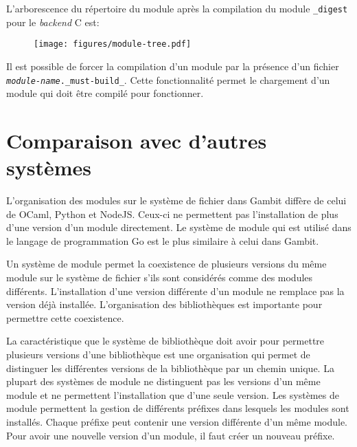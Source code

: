 L'arborescence du répertoire du module après la compilation du module
\texttt{\_digest} pour le \textit{backend} C est:
%
\begin{figure}[ht]
  \centering
  \texttt{[image: figures/module-tree.pdf]}
\end{figure}

Il est possible de forcer la compilation d'un module par la présence d'un fichier
\texttt{\textit{module-name}.\_must-build\_}. Cette fonctionnalité permet le chargement d'un
module qui doit être compilé pour fonctionner.


\section{Comparaison avec d'autres systèmes}

L'organisation des modules sur le système de fichier dans Gambit
diffère de celui de OCaml, Python et NodeJS. Ceux-ci ne permettent pas
l'installation de plus d'une version d'un module directement. Le système
de module qui est utilisé dans le langage de programmation Go est le plus
similaire à celui dans Gambit.

Un système de module permet la coexistence de plusieurs versions du même module
sur le système de fichier s'ils sont considérés comme des modules différents.
L'installation d'une version différente d'un module ne remplace pas la version
déjà installée. L'organisation des bibliothèques est importante pour permettre
cette coexistence.

La caractéristique que le système de bibliothèque doit avoir pour permettre
plusieurs versions d'une bibliothèque est une organisation qui permet de
distinguer les différentes versions de la bibliothèque par un chemin unique.
La plupart des systèmes de module ne distinguent pas les versions d'un même
module et ne permettent l'installation que d'une seule version. Les systèmes de
module permettent la gestion de différents préfixes dans lesquels les modules sont
installés. Chaque préfixe peut contenir une version différente d'un même
module. Pour avoir une nouvelle version d'un module, il faut créer un nouveau
préfixe.





